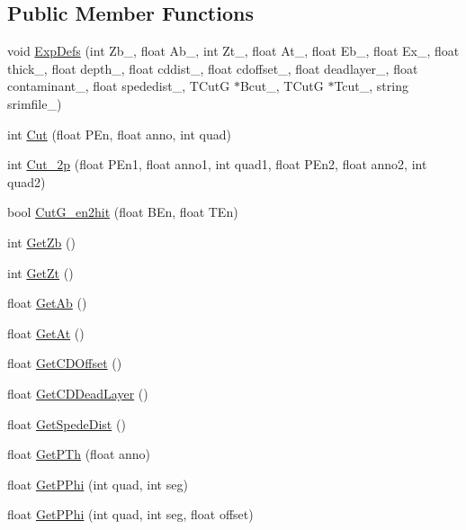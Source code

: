 \subsection*{Public Member Functions}
\begin{DoxyCompactItemize}
\item 
void \hyperlink{classdoppler_aec4f49113b347c342672485368b2ad8c}{Exp\-Defs} (int Zb\-\_\-, float Ab\-\_\-, int Zt\-\_\-, float At\-\_\-, float Eb\-\_\-, float Ex\-\_\-, float thick\-\_\-, float depth\-\_\-, float cddist\-\_\-, float cdoffset\-\_\-, float deadlayer\-\_\-, float contaminant\-\_\-, float spededist\-\_\-, T\-Cut\-G $\ast$Bcut\-\_\-, T\-Cut\-G $\ast$Tcut\-\_\-, string srimfile\-\_\-)
\item 
int \hyperlink{classdoppler_aa3debb227d73f7cdea5b02e4c202cb19}{Cut} (float P\-En, float anno, int quad)
\item 
int \hyperlink{classdoppler_a52f116733da78465469a75ced66915a8}{Cut\-\_\-2p} (float P\-En1, float anno1, int quad1, float P\-En2, float anno2, int quad2)
\item 
bool \hyperlink{classdoppler_a56df9f9384f469385458193754c743c9}{Cut\-G\-\_\-en2hit} (float B\-En, float T\-En)
\item 
int \hyperlink{classdoppler_a29e9a1565d90df9f5d9deef05cdbf53c}{Get\-Zb} ()
\item 
int \hyperlink{classdoppler_ac0587ca2b963edec86d17dd6dac024ce}{Get\-Zt} ()
\item 
float \hyperlink{classdoppler_a364b85a1e3be8f5386dab5f0b6fe2da3}{Get\-Ab} ()
\item 
float \hyperlink{classdoppler_aef253058a4cae5ab5c6b2662d6afb39d}{Get\-At} ()
\item 
float \hyperlink{classdoppler_ac7725720fab82af5a5a6f02041bc9483}{Get\-C\-D\-Offset} ()
\item 
float \hyperlink{classdoppler_a2c1aef6db4ad3fc0c98e91d995992706}{Get\-C\-D\-Dead\-Layer} ()
\item 
float \hyperlink{classdoppler_ae45abdba9f375009cdeba5ac81d7b32c}{Get\-Spede\-Dist} ()
\item 
float \hyperlink{classdoppler_a1415bdb47dbb9d5eba7f14a64bd3693e}{Get\-P\-Th} (float anno)
\item 
float \hyperlink{classdoppler_a0f57a8f4a8c369c14d52e62dd3833f2e}{Get\-P\-Phi} (int quad, int seg)
\item 
float \hyperlink{classdoppler_ac8f059cc77214a954be534a85c748a3c}{Get\-P\-Phi} (int quad, int seg, float offset)
\item 

\end{DoxyCompactItemize}
